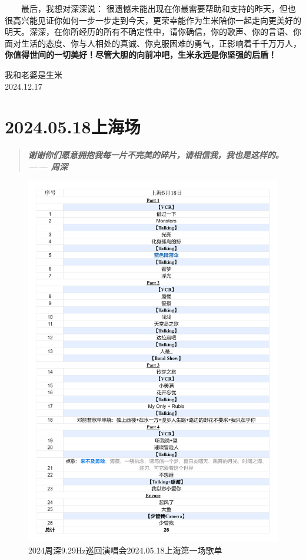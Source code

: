 \documentclass[]{ctexbook}
\begin{document}
  最后，我想对深深说： 很遗憾未能出现在你最需要帮助和支持的昨天，但也很高兴能见证你如何一步一步走到今天，更荣幸能作为生米陪你一起走向更美好的明天。深深，在你所经历的所有不确定性中，请你确信，你的歌声、你的言语、你面对生活的态度、你与人相处的真诚、你克服困难的勇气，正影响着千千万万人，\textbf{你值得世间的一切美好！尽管大胆的向前冲吧，生米永远是你坚强的后盾！}

我和老婆是生米\\
2024.12.17

\chapter{2024.05.18上海场}\label{shanghai-20240518}

\begin{quote}
\textbf{\emph{谢谢你们愿意拥抱我每一片不完美的碎片，请相信我，我也是这样的。 ------ 周深}}
\end{quote}

\begin{figure}

{\centering \includegraphics[width=320pt]{img/playlists/playlists-shanghai-20240518} 

}

\caption{2024周深9.29Hz巡回演唱会2024.05.18上海第一场歌单}\label{fig:unnamed-chunk-32}
\end{figure}
\end{document}
